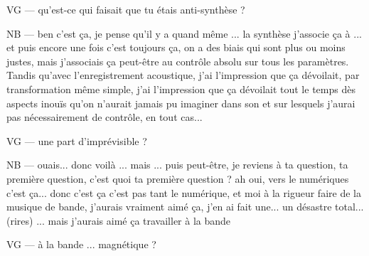 VG —  qu'est-ce qui faisait que tu étais anti-synthèse ?

NB — ben c'est ça, je pense qu'il y a quand même ... la synthèse j'associe ça à ... et puis encore une fois c'est toujours ça, on a des biais qui sont plus ou moins justes, mais j'associais ça peut-être au contrôle absolu sur tous les paramètres. Tandis qu'avec l'enregistrement acoustique, j'ai l'impression que ça dévoilait, par transformation même simple, j'ai l'impression que ça dévoilait tout le temps dès aspects inouïs qu'on n'aurait jamais pu imaginer dans son et sur lesquels j'aurai pas nécessairement de contrôle, en tout cas...

VG — une part d'imprévisible ?

NB — ouais... donc voilà ... mais ... puis peut-être, je reviens à ta question, ta première question, c'est quoi ta première question ? ah oui, vers le numériques c'est ça...  donc c'est ça c'est pas tant le numérique, et moi à la rigueur faire de la musique de bande, j'aurais vraiment aimé ça, j'en ai fait une... un désastre total... (rires) ... mais j'aurais aimé ça travailler à la bande 

VG — à la bande ... magnétique ?

